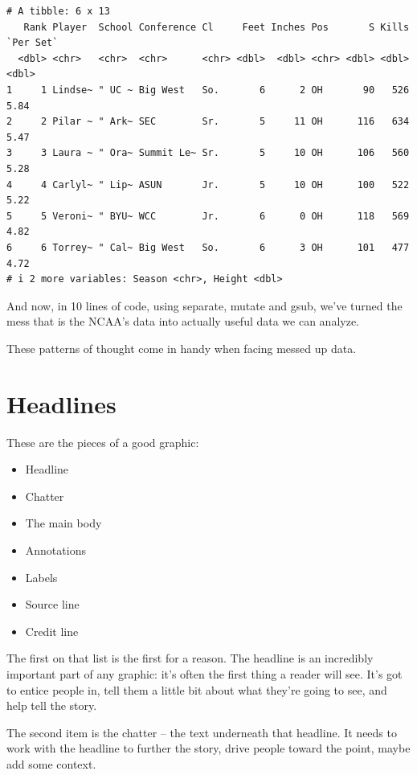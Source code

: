 \documentclass[
  letterpaper,
  DIV=11,
  numbers=noendperiod]{scrreprt}
\providecommand{\tightlist}{%
  \setlength{\itemsep}{0pt}\setlength{\parskip}{0pt}}\usepackage{longtable,booktabs,array}
\begin{document}
\begin{verbatim}
# A tibble: 6 x 13
   Rank Player  School Conference Cl     Feet Inches Pos       S Kills `Per Set`
  <dbl> <chr>   <chr>  <chr>      <chr> <dbl>  <dbl> <chr> <dbl> <dbl>     <dbl>
1     1 Lindse~ " UC ~ Big West   So.       6      2 OH       90   526      5.84
2     2 Pilar ~ " Ark~ SEC        Sr.       5     11 OH      116   634      5.47
3     3 Laura ~ " Ora~ Summit Le~ Sr.       5     10 OH      106   560      5.28
4     4 Carlyl~ " Lip~ ASUN       Jr.       5     10 OH      100   522      5.22
5     5 Veroni~ " BYU~ WCC        Jr.       6      0 OH      118   569      4.82
6     6 Torrey~ " Cal~ Big West   So.       6      3 OH      101   477      4.72
# i 2 more variables: Season <chr>, Height <dbl>
\end{verbatim}

And now, in 10 lines of code, using separate, mutate and gsub, we've
turned the mess that is the NCAA's data into actually useful data we can
analyze.

These patterns of thought come in handy when facing messed up data.


\hypertarget{headlines}{%
\chapter{Headlines}\label{headlines}}

These are the pieces of a good graphic:

\begin{itemize}
\tightlist
\item
  Headline
\item
  Chatter
\item
  The main body
\item
  Annotations
\item
  Labels
\item
  Source line
\item
  Credit line
\end{itemize}

The first on that list is the first for a reason. The headline is an
incredibly important part of any graphic: it's often the first thing a
reader will see. It's got to entice people in, tell them a little bit
about what they're going to see, and help tell the story.

The second item is the chatter -- the text underneath that headline. It
needs to work with the headline to further the story, drive people
toward the point, maybe add some context.
\end{document}
